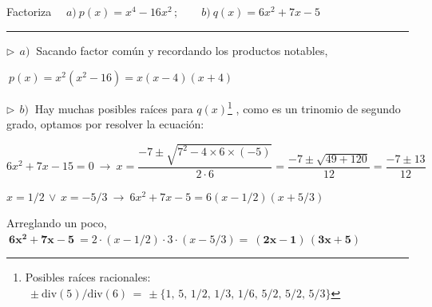 \begin{miejercicio}

Factoriza $\quad  a)\ p(x)=x^4-16x^2\, ; \qquad b)\ q(x)=6x^2+7x-5$

\rule{250pt}{0.1pt}

$\triangleright \ \  a)\ $ Sacando factor común y recordando los productos notables,

$\ p(x)=x^2(x^2-16)=x(x-4)(x+4)$

\vspace{4mm} $\triangleright \ \  b)\ $ Hay muchas posibles raíces para $q(x)$\footnote{ Posibles raíces racionales: $\ \pm \mathrm{div}(5)/\mathrm{div}(6)\, =\, \pm \{ 1,\, 5,\, 1/2,\, 1/3,\, 1/6,\, 5/2,\, 5/2,\, 5/3 \} $} , como es un trinomio de segundo grado, optamos por resolver la ecuación:

$6x^2+7x-15=0  \ \to \ x=\dfrac{-7\pm \sqrt{7^2-4\times 6 \times (-5)}}{2\cdot 6}=\dfrac{-7\pm \sqrt{49+120}}{12}=\dfrac{-7\pm 13}{12}$

$x=1/2 \, \vee \, x=-5/3 \ \to \ 6x^2+7x-5=6 (x-1/2)(x+5/3)$

Arreglando un poco, $\ \boldsymbol{6x^2+7x-5} \ = 2\cdot (x-1/2) \cdot 3\cdot (x-5/3) = \ \boldsymbol{(2x-1)\, (3x+5)}$
	
\end{miejercicio}


\vspace{5mm} %

